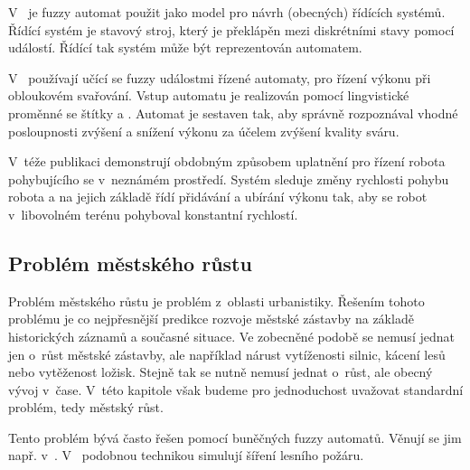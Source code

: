 V~\cite{WeeFu-FormFuzAutAppModLeaSys, GraFod-FuzAutIntHybConSys} je fuzzy automat použit jako model pro návrh (obecných) řídících systémů. Řídící systém je stavový stroj, který je překlápěn mezi diskrétními stavy pomocí událostí. Řídící tak systém může být reprezentován automatem.


V~\cite{TzaRig-StaAnaAdaFuzzConSysUsiPetrNetLeaAut} používají učící se fuzzy událostmi řízené automaty, pro řízení výkonu při obloukovém svařování. Vstup automatu je realizován pomocí lingvistické proměnné  se štítky  a . Automat je sestaven tak, aby správně rozpoznával vhodné posloupnosti zvýšení a snížení výkonu za účelem zvýšení kvality sváru. 

V~téže publikaci demonstrují obdobným způsobem uplatnění pro řízení robota pohybujícího se v~neznámém prostředí. Systém sleduje změny rychlosti pohybu robota a na jejich základě řídí přidávání a ubírání výkonu tak, aby se robot v~libovolném terénu pohyboval konstantní rychlostí.

\subsection{Problém městského růstu} \label{subs:UrbGrow}
Problém městského růstu je problém z~oblasti urbanistiky. Řešením tohoto problému je co nejpřesnější predikce rozvoje městské zástavby na základě historických záznamů a současné situace. Ve zobecněné podobě se nemusí jednat jen o~růst městské zástavby, ale například nárust vytíženosti silnic, kácení lesů nebo vytěženost ložisk. Stejně tak se nutně nemusí jednat o~růst, ale obecný vývoj v~čase. V~této kapitole však budeme pro jednoduchost uvažovat standardní problém, tedy městský růst.

Tento problém bývá často řešen pomocí buněčných fuzzy automatů. Věnují se jim např. v~\cite{AlAhHep+-ModUrbGroDynUsCelAutGIS, Ahm+-CalFuzCelAutModUrbDynSauAr, War+-StoConCelModUrbGro, WhiEng-CelAutBasIntDynRegMod, LaiDraSch-IntMulEvCelAutMetLanSimMod, ManHatPra-FuzCelAutBasSheModUrGro+, ManHatPra-ModUrbGroUsFuzCelAut, Wu-CalStoCelAutAppRurUrbLanConv, PowSimWhi-HieFuzzPattMatcRegCompLanUseMap, Dra-CouFuzSetTheGisBaCelAutLanUseChaMod, WasPar-PreSpaDisEleEnCon+, LiuPhi-DevCelAutModUrbGroIncFuzSetApp}. V~\cite{MraZimLapBaj-FuzCelAut+} podobnou technikou simulují šíření lesního požáru.


